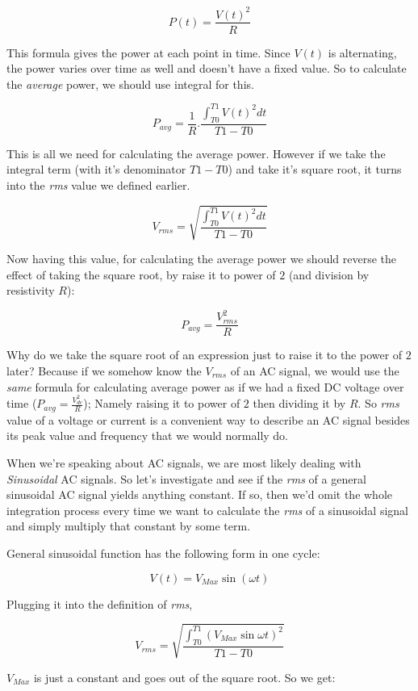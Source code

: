 \documentclass{article}
\begin{document}
	$$P(t) = \frac{V(t)^2}{R}$$
	
	This formula gives the power at each point in time. Since $V(t)$ is alternating, the power varies over time as well and doesn't have a fixed value. So to calculate the \textit{average} power, we should use integral for this.
	
	$$P_{avg} = \frac{1}{R}.\frac{\int_{T0}^{T1} V(t)^2 dt }{T1 - T0}$$
	
	This is all we need for calculating the average power. However if we take the integral term (with it's denominator $T1 - T0$) and take it's square root, it turns into the \textit{rms} value we defined earlier.
	
	$$V_{rms} = \sqrt{\frac{\int_{T0}^{T1} V(t)^2 dt }{T1 - T0}} $$
	
	Now having this value, for calculating the average power we should reverse the effect of taking the square root, by raise it to power of $2$ (and division by resistivity $R$):
	
	$$ P_{avg} = \frac{V^2_{rms}}{R} $$
	
	Why do we take the square root of an expression just to raise it to the power of $2$ later? Because if we somehow know the $V_{rms}$ of an AC signal, we would use the \textit{same} formula for calculating average power as if we had a fixed DC voltage over time ($P_{avg} = \frac{V^2_{dc}}{R}$); Namely raising it to power of $2$ then dividing it by $R$. So \textit{rms} value of a voltage or current is a convenient way to describe an AC signal besides its peak value and frequency that we would normally do.
	
	When we're speaking about AC signals, we are most likely dealing with \textit{Sinusoidal} AC signals. So let's investigate and see if the \textit{rms} of a general sinusoidal AC signal yields anything constant. If so, then we'd omit the whole integration process every time we want to calculate the \textit{rms} of a sinusoidal signal and simply multiply that constant by some term. \textsl{}
	
	General sinusoidal function has the following form in one cycle:
	
	$$ V(t) = V_{Max} \sin(\omega t) $$
	
	Plugging it into the definition of \textit{rms},
	
	$$V_{rms} = \sqrt{\frac{\int_{T0}^{T1} (V_{Max} \sin \omega t) ^ 2}{T1 - T0}}$$
	
	$V_{Max}$ is just a constant and goes out of the square root. So we get:
	
\end{document}
